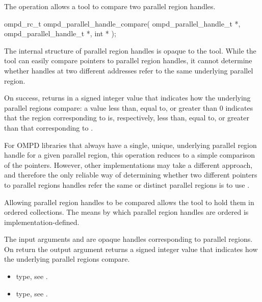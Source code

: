 \label{subsubsubsec:ompd_parallel_handle_compare}
\summary
The  operation allows a tool to compare two
parallel region handles.

\format

\begin{cspecific}
\begin{ompSyntax}
ompd_rc_t ompd_parallel_handle_compare(
  ompd_parallel_handle_t *,
  ompd_parallel_handle_t *,
  int *
);
\end{ompSyntax}
\end{cspecific}


\descr
The internal structure of parallel region handles is opaque to the tool. While the tool can easily
compare pointers to parallel region handles, it cannot determine whether handles at two different
addresses refer to the same underlying parallel region.

On success,  returns in  a signed
integer value that indicates how the underlying parallel regions compare: a value less than, equal
to, or greater than 0 indicates that the region corresponding to  is,
respectively, less than, equal to, or greater than that corresponding to .

For OMPD libraries that always have a single, unique, underlying parallel region handle for
a given parallel region, this operation reduces to a simple comparison of the pointers. However,
other implementations may take a different approach, and therefore the only reliable way of
determining whether two different pointers to parallel regions handles refer the same or distinct
parallel regions is to use .

Allowing parallel region handles to be compared allows the tool to hold them in ordered
collections. The means by which parallel region handles are ordered is implementation-defined.

\argdesc

The input arguments  and  are opaque handles
corresponding to parallel regions.
On return the output argument   returns a signed
integer value that indicates how the underlying parallel regions compare.

\crossreferences
\begin{itemize}
  \item {} type, see .
	\item {} type, see .
\end{itemize}


